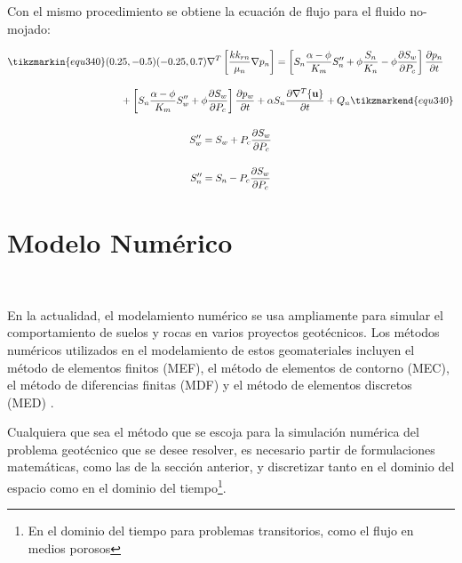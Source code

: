 Con el mismo procedimiento se obtiene la ecuación de flujo para el fluido no-mojado:
\begin{ceqn} 
\begin{subequations} \label{eq:equ340} 
\begin{gather}
\begin{multlined}
\tikzmarkin{equ340}(0.25,-0.5)(-0.25,0.7)
\nabla^T \left[\frac{k k_{rn}}{\mu_{n}}\nabla p_n\right] = \left[S_n \frac{\alpha - \phi}{K_m}S''_n + \phi\frac{S_n}{K_n} - \phi\frac{\partial S_w}{\partial P_c}\right]\frac{\partial p_n}{\partial t} \\[10pt]
+ \left[S_n \frac{\alpha - \phi}{K_m}S''_w + \phi\frac{\partial S_w}{\partial P_c}\right]\frac{\partial p_w}{\partial t} +\alpha S_n\frac{\partial \nabla^T \{\mathbf{u}\}}{\partial t} + Q_n \tikzmarkend{equ340} \label{eq:equ340a}
\end{multlined}\\[12pt]
S''_w = S_w + P_c\frac{\partial S_w}{\partial P_c}  \label{eq:equ340b}\\[12pt]
S''_n = S_n - P_c\frac{\partial S_w}{\partial P_c}  \label{eq:equ340c}
\end{gather}  
\end{subequations} 
\end{ceqn}



\section{Modelo Numérico}~\hypertarget{sec:sec340}{}
\label{sec:sec340}

En la actualidad, el modelamiento numérico se usa ampliamente para simular el comportamiento de suelos y rocas en varios proyectos geotécnicos. Los métodos numéricos utilizados en el modelamiento de estos geomateriales incluyen el método de elementos finitos (MEF), el método de elementos de contorno (MEC), el método de diferencias finitas (MDF) y el método de elementos discretos (MED) \cite{Li2018RockboltingApplications}.\bigskip 

Cualquiera que sea el método que se escoja para la simulación numérica del problema geotécnico que se desee resolver, es necesario partir de formulaciones matemáticas, como las de la sección anterior, y discretizar tanto en el dominio del espacio como en el dominio del tiempo\footnote{En el dominio del tiempo para problemas transitorios, como el flujo en medios porosos}.\bigskip


